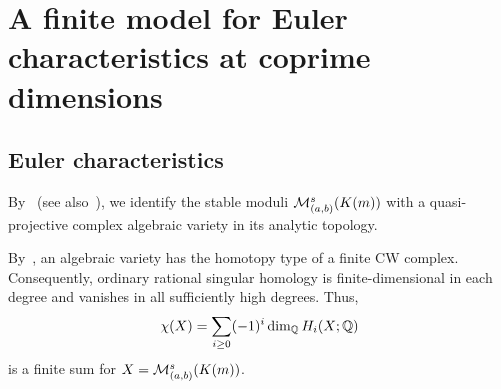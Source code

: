 \section{A finite model for Euler characteristics at coprime dimensions}\label{sec:dictionary}
\subsection{Euler characteristics}\label{subsec:euler-characteristics}
By~\cite[Theorem 4.1 and Proposition 4.3]{King}
(see also~\cite[Proposition 3.5 and Section 3.5]{Rei08}), we identify
the stable moduli $\mathcal M^s_{(a,b)}(K(m))$ with a quasi-projective complex
algebraic variety in its analytic topology.

By~\cite[Corollary 6.10]{Dimca}, an algebraic variety has the
homotopy type of a finite CW complex. Consequently, ordinary rational singular homology is finite-dimensional in each degree and vanishes in all sufficiently high degrees. Thus,
\[
 \chi(X)=\sum_{i\ge0}(-1)^i\dim_{\mathbb Q}H_i(X;\mathbb Q)
\]
is a finite sum for $X=\mathcal M^s_{(a,b)}(K(m))$.

